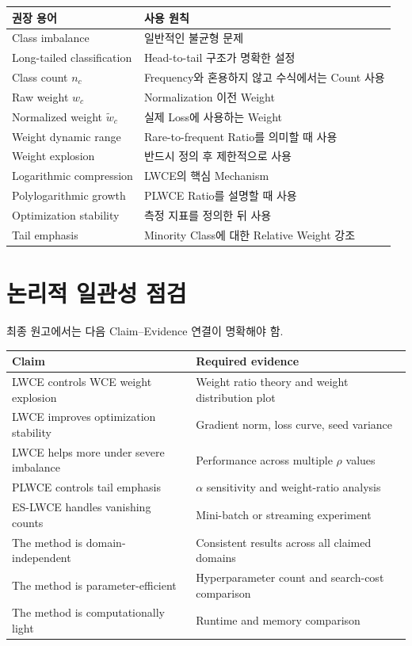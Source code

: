 \documentclass[11pt,a4paper]{article}
\begin{document}
\begin{longtable}{p{5cm}p{9cm}}
\toprule
권장 용어 & 사용 원칙 \\
\midrule
Class imbalance & 일반적인 불균형 문제 \\
Long-tailed classification & Head-to-tail 구조가 명확한 설정 \\
Class count \(n_c\) & Frequency와 혼용하지 않고 수식에서는 Count 사용 \\
Raw weight \(w_c\) & Normalization 이전 Weight \\
Normalized weight \(\widetilde{w}_c\) & 실제 Loss에 사용하는 Weight \\
Weight dynamic range & Rare-to-frequent Ratio를 의미할 때 사용 \\
Weight explosion & 반드시 정의 후 제한적으로 사용 \\
Logarithmic compression & LWCE의 핵심 Mechanism \\
Polylogarithmic growth & PLWCE Ratio를 설명할 때 사용 \\
Optimization stability & 측정 지표를 정의한 뒤 사용 \\
Tail emphasis & Minority Class에 대한 Relative Weight 강조 \\
\bottomrule
\end{longtable}

\section{논리적 일관성 점검}

최종 원고에서는 다음 Claim--Evidence 연결이 명확해야 함.

\begin{longtable}{p{6cm}p{8cm}}
\toprule
Claim & Required evidence \\
\midrule
LWCE controls WCE weight explosion & Weight ratio theory and weight distribution plot \\
LWCE improves optimization stability & Gradient norm, loss curve, seed variance \\
LWCE helps more under severe imbalance & Performance across multiple \(\rho\) values \\
PLWCE controls tail emphasis & \(\alpha\) sensitivity and weight-ratio analysis \\
ES-LWCE handles vanishing counts & Mini-batch or streaming experiment \\
The method is domain-independent & Consistent results across all claimed domains \\
The method is parameter-efficient & Hyperparameter count and search-cost comparison \\
The method is computationally light & Runtime and memory comparison \\
\bottomrule
\end{longtable}
\end{document}
